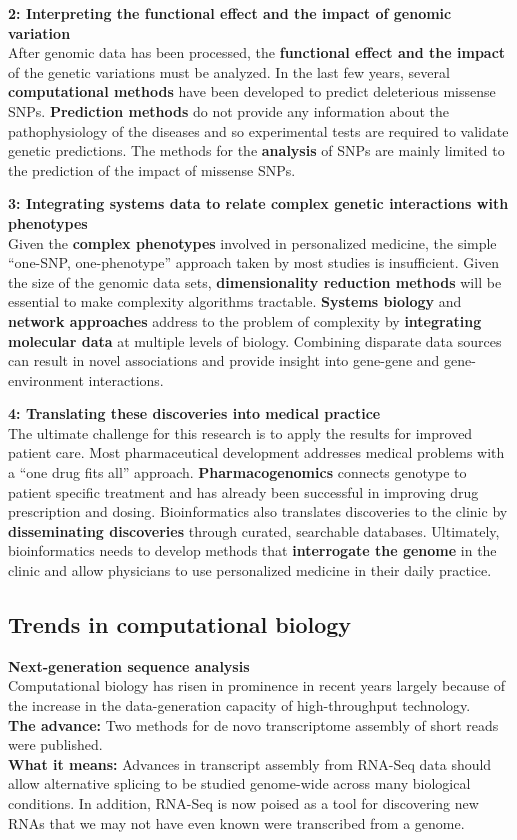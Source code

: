 \documentclass[10pt,a4paper]{report}
\begin{document}
	\textbf{2: Interpreting the functional effect and the impact of genomic variation}\\
	After genomic data has been processed, the \textbf{functional effect and the impact} of the genetic variations must be analyzed.
	In the last few years, several \textbf{computational methods} have been developed to predict deleterious missense SNPs.
	\textbf{Prediction methods} do not provide any information about the pathophysiology of the diseases and so experimental tests are required to validate genetic predictions.
	The methods for the \textbf{analysis} of SNPs are mainly limited to the prediction of the impact of missense SNPs.
	
	\textbf{3: Integrating systems data to relate complex genetic interactions with phenotypes}\\
	Given the \textbf{complex phenotypes} involved in personalized medicine, the simple “one-SNP, one-phenotype” approach taken by most studies is insufficient.
	Given the size of the genomic data sets, \textbf{dimensionality reduction methods} will be essential to make complexity algorithms tractable.
	\textbf{Systems biology} and \textbf{network approaches} address to the problem of complexity by \textbf{integrating molecular data} at multiple levels of biology.
	Combining disparate data sources can result in novel associations and provide insight into gene-gene and gene-environment interactions.
	
	\textbf{4: Translating these discoveries into medical practice}\\
	The ultimate challenge for this research is to apply the results for improved patient care.
	Most pharmaceutical development addresses medical problems with a “one drug fits all” approach.
	\textbf{Pharmacogenomics} connects genotype to patient specific treatment and has already been successful in improving drug prescription and dosing.
	Bioinformatics also translates discoveries to the clinic by \textbf{disseminating discoveries} through curated, searchable databases.
	Ultimately, bioinformatics needs to develop methods that \textbf{interrogate the genome} in the clinic and allow physicians to use personalized medicine in their daily practice.
	
	\subsection{Trends in computational biology}
	\hspace*{0.5cm}\textbf{Next-generation sequence analysis}\\
	Computational biology has risen in prominence in recent years largely because of the increase in the data-generation capacity of high-throughput technology.\\
	\textbf{The advance:} Two methods for de novo transcriptome assembly of short reads were published.\\
	\textbf{What it means:} Advances in transcript assembly from RNA-Seq data should allow alternative splicing to be studied genome-wide across many biological conditions.
	In addition, RNA-Seq is now poised as a tool for discovering new RNAs that we may not have even known were transcribed from a genome.\\
	
\end{document}
